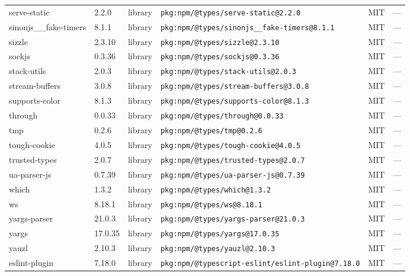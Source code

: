 \documentclass[11pt,a4paper]{article}
\begin{document}
\begin{longtable}{|p{4cm}|p{2cm}|p{1.6cm}|p{5cm}|p{1.5cm}|p{3.5cm}|}
\raggedright serve-static & 2.2.0 & library & \small\texttt{pkg:npm/@types/serve-static@2.2.0} & MIT & \small — \\
\raggedright sinonjs\_\_fake-timers & 8.1.1 & library & \small\texttt{pkg:npm/@types/sinonjs\_\_fake-timers@8.1.1} & MIT & \small — \\
\raggedright sizzle & 2.3.10 & library & \small\texttt{pkg:npm/@types/sizzle@2.3.10} & MIT & \small — \\
\raggedright sockjs & 0.3.36 & library & \small\texttt{pkg:npm/@types/sockjs@0.3.36} & MIT & \small — \\
\raggedright stack-utils & 2.0.3 & library & \small\texttt{pkg:npm/@types/stack-utils@2.0.3} & MIT & \small — \\
\raggedright stream-buffers & 3.0.8 & library & \small\texttt{pkg:npm/@types/stream-buffers@3.0.8} & MIT & \small — \\
\raggedright supports-color & 8.1.3 & library & \small\texttt{pkg:npm/@types/supports-color@8.1.3} & MIT & \small — \\
\raggedright through & 0.0.33 & library & \small\texttt{pkg:npm/@types/through@0.0.33} & MIT & \small — \\
\raggedright tmp & 0.2.6 & library & \small\texttt{pkg:npm/@types/tmp@0.2.6} & MIT & \small — \\
\raggedright tough-cookie & 4.0.5 & library & \small\texttt{pkg:npm/@types/tough-cookie@4.0.5} & MIT & \small — \\
\raggedright trusted-types & 2.0.7 & library & \small\texttt{pkg:npm/@types/trusted-types@2.0.7} & MIT & \small — \\
\raggedright ua-parser-js & 0.7.39 & library & \small\texttt{pkg:npm/@types/ua-parser-js@0.7.39} & MIT & \small — \\
\raggedright which & 1.3.2 & library & \small\texttt{pkg:npm/@types/which@1.3.2} & MIT & \small — \\
\raggedright ws & 8.18.1 & library & \small\texttt{pkg:npm/@types/ws@8.18.1} & MIT & \small — \\
\raggedright yargs-parser & 21.0.3 & library & \small\texttt{pkg:npm/@types/yargs-parser@21.0.3} & MIT & \small — \\
\raggedright yargs & 17.0.35 & library & \small\texttt{pkg:npm/@types/yargs@17.0.35} & MIT & \small — \\
\raggedright yauzl & 2.10.3 & library & \small\texttt{pkg:npm/@types/yauzl@2.10.3} & MIT & \small — \\
\raggedright eslint-plugin & 7.18.0 & library & \small\texttt{pkg:npm/@typescript-eslint/eslint-plugin@7.18.0} & MIT & \small — \\

\end{longtable}
\end{document}
